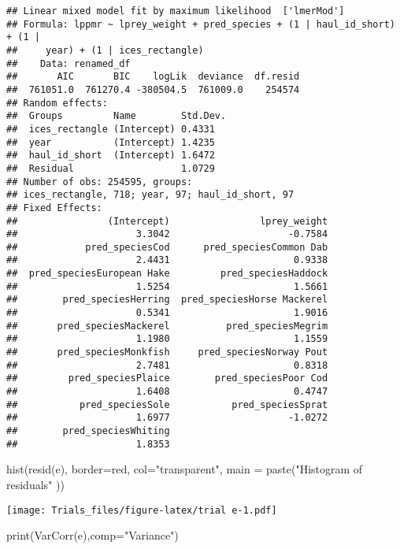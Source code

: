 \documentclass[
]{article}
\newenvironment{Shaded}{\begin{snugshade}}{\end{snugshade}}
\newcommand{\AttributeTok}[1]{\textcolor[rgb]{0.77,0.63,0.00}{#1}}
\newcommand{\FunctionTok}[1]{\textcolor[rgb]{0.00,0.00,0.00}{#1}}
\newcommand{\NormalTok}[1]{#1}
\newcommand{\StringTok}[1]{\textcolor[rgb]{0.31,0.60,0.02}{#1}}
\begin{document}
\begin{verbatim}
## Linear mixed model fit by maximum likelihood  ['lmerMod']
## Formula: lppmr ~ lprey_weight + pred_species + (1 | haul_id_short) + (1 |  
##     year) + (1 | ices_rectangle)
##    Data: renamed_df
##       AIC       BIC    logLik  deviance  df.resid 
##  761051.0  761270.4 -380504.5  761009.0    254574 
## Random effects:
##  Groups         Name        Std.Dev.
##  ices_rectangle (Intercept) 0.4331  
##  year           (Intercept) 1.4235  
##  haul_id_short  (Intercept) 1.6472  
##  Residual                   1.0729  
## Number of obs: 254595, groups:  
## ices_rectangle, 718; year, 97; haul_id_short, 97
## Fixed Effects:
##                (Intercept)                lprey_weight  
##                     3.3042                     -0.7584  
##            pred_speciesCod      pred_speciesCommon Dab  
##                     2.4431                      0.9338  
##  pred_speciesEuropean Hake         pred_speciesHaddock  
##                     1.5254                      1.5661  
##        pred_speciesHerring  pred_speciesHorse Mackerel  
##                     0.5341                      1.9016  
##       pred_speciesMackerel          pred_speciesMegrim  
##                     1.1980                      1.1559  
##       pred_speciesMonkfish     pred_speciesNorway Pout  
##                     2.7481                      0.8318  
##         pred_speciesPlaice        pred_speciesPoor Cod  
##                     1.6408                      0.4747  
##           pred_speciesSole           pred_speciesSprat  
##                     1.6977                     -1.0272  
##        pred_speciesWhiting  
##                     1.8353
\end{verbatim}

\begin{Shaded}
\begin{Highlighting}[]
\FunctionTok{hist}\NormalTok{(}\FunctionTok{resid}\NormalTok{(e), }\AttributeTok{border=}\StringTok{\textquotesingle{}red\textquotesingle{}}\NormalTok{, }\AttributeTok{col=}\StringTok{"transparent"}\NormalTok{, }\AttributeTok{main =} \FunctionTok{paste}\NormalTok{(}\StringTok{"Histogram of residuals"}\NormalTok{ ))}
\end{Highlighting}
\end{Shaded}

\texttt{[image: Trials\_files/figure-latex/trial e-1.pdf]}

\begin{Shaded}
\begin{Highlighting}[]
\FunctionTok{print}\NormalTok{(}\FunctionTok{VarCorr}\NormalTok{(e),}\AttributeTok{comp=}\StringTok{"Variance"}\NormalTok{)}
\end{Highlighting}
\end{Shaded}
\end{document}

